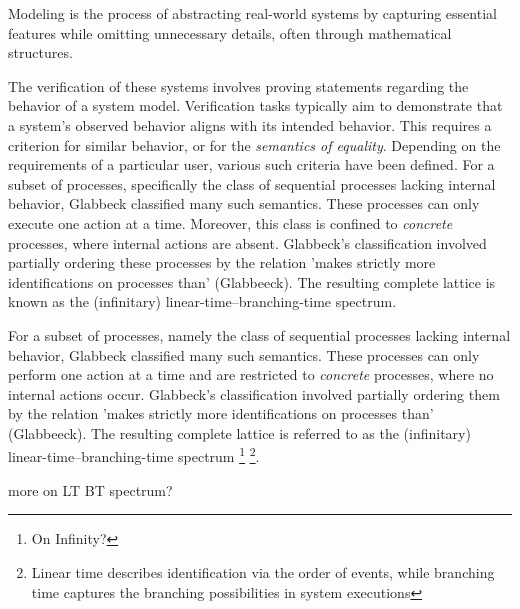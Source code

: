 \begin{isabellebody}
\begin{isamarkuptext}
Modeling is the process of abstracting real-world systems by capturing essential features while omitting unnecessary details, 
often through mathematical structures. 

The verification of these systems involves proving statements regarding the behavior of a system model.
Verification tasks typically aim to demonstrate that a system's observed behavior aligns with its intended behavior. 
This requires a criterion for similar behavior, or for the \textit{semantics of equality}. Depending on the requirements of a particular user, various such criteria have been defined.
For a subset of processes, specifically the class of sequential processes lacking internal behavior, Glabbeck classified many such semantics. 
These processes can only execute one action at a time. Moreover, this class is confined to \textit{concrete} processes, 
where internal actions are absent. Glabbeck's classification involved partially ordering these processes by the relation 'makes strictly more identifications on processes than' (Glabbeeck). 
The resulting complete lattice is known as the (infinitary) linear-time--branching-time spectrum.



For a subset of processes, namely the class of sequential processes lacking internal behavior, Glabbeck classified many such semantics. These processes can only perform one action at a time and are restricted to \textit{concrete} processes, where no internal actions occur. Glabbeck's classification involved partially ordering them by the relation 'makes strictly more identifications on processes than' (Glabbeeck). The resulting complete lattice is referred to as the (infinitary) linear-time--branching-time spectrum \footnote{On Infinity?} \footnote{Linear time describes identification via the order of events, while branching time captures the branching possibilities in system executions}.

more on LT BT spectrum?


\end{isamarkuptext}
\end{isabellebody}
